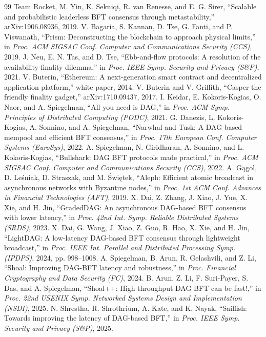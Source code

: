 \documentclass[UTF8,fontset=windows,a4paper,11pt]{ctexart}
\begin{document}
\begin{thebibliography}{99}
 Team Rocket, M. Yin, K. Sekniqi, R. van Renesse, and E. G. Sirer, “Scalable and probabilistic leaderless BFT consensus through metastability,” arXiv:1906.08936, 2019.
 V. Bagaria, S. Kannan, D. Tse, G. Fanti, and P. Viswanath, “Prism: Deconstructing the blockchain to approach physical limits,” in \textit{Proc. ACM SIGSAC Conf. Computer and Communications Security (CCS)}, 2019.
 J. Neu, E. N. Tas, and D. Tse, “Ebb-and-flow protocols: A resolution of the availability-finality dilemma,” in \textit{Proc. IEEE Symp. Security and Privacy (S\&P)}, 2021.
 V. Buterin, “Ethereum: A next-generation smart contract and decentralized application platform,” white paper, 2014.
 V. Buterin and V. Griffith, “Casper the friendly finality gadget,” arXiv:1710.09437, 2017.
 I. Keidar, E. Kokoris-Kogias, O. Naor, and A. Spiegelman, “All you need is DAG,” in \textit{Proc. ACM Symp. Principles of Distributed Computing (PODC)}, 2021.
 G. Danezis, L. Kokoris-Kogias, A. Sonnino, and A. Spiegelman, “Narwhal and Tusk: A DAG-based mempool and efficient BFT consensus,” in \textit{Proc. 17th European Conf. Computer Systems (EuroSys)}, 2022.
 A. Spiegelman, N. Giridharan, A. Sonnino, and L. Kokoris-Kogias, “Bullshark: DAG BFT protocols made practical,” in \textit{Proc. ACM SIGSAC Conf. Computer and Communications Security (CCS)}, 2022.
 A. Gągol, D. Leśniak, D. Straszak, and M. Świętek, “Aleph: Efficient atomic broadcast in asynchronous networks with Byzantine nodes,” in \textit{Proc. 1st ACM Conf. Advances in Financial Technologies (AFT)}, 2019.
 X. Dai, Z. Zhang, J. Xiao, J. Yue, X. Xie, and H. Jin, “GradedDAG: An asynchronous DAG-based BFT consensus with lower latency,” in \textit{Proc. 42nd Int. Symp. Reliable Distributed Systems (SRDS)}, 2023.
 X. Dai, G. Wang, J. Xiao, Z. Guo, R. Hao, X. Xie, and H. Jin, “LightDAG: A low-latency DAG-based BFT consensus through lightweight broadcast,” in \textit{Proc. IEEE Int. Parallel and Distributed Processing Symp. (IPDPS)}, 2024, pp. 998–1008.
 A. Spiegelman, B. Arun, R. Gelashvili, and Z. Li, “Shoal: Improving DAG-BFT latency and robustness,” in \textit{Proc. Financial Cryptography and Data Security (FC)}, 2024.
 B. Arun, Z. Li, F. Suri-Payer, S. Das, and A. Spiegelman, “Shoal++: High throughput DAG BFT can be fast!,” in \textit{Proc. 22nd USENIX Symp. Networked Systems Design and Implementation (NSDI)}, 2025.
 N. Shrestha, R. Shrothrium, A. Kate, and K. Nayak, “Sailfish: Towards improving the latency of DAG-based BFT,” in \textit{Proc. IEEE Symp. Security and Privacy (S\&P)}, 2025.

\end{thebibliography}
\end{document}

